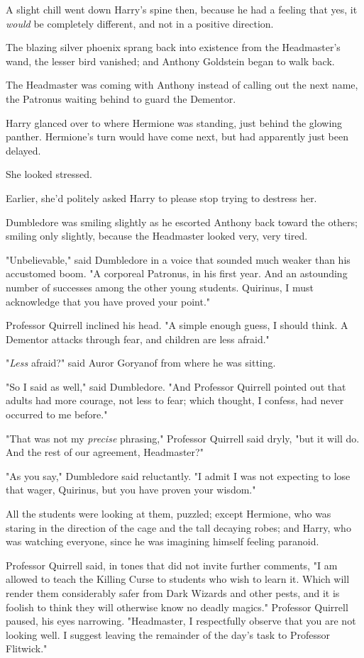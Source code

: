 A slight chill went down Harry's spine then, because he had a feeling that yes,
it \emph{would} be completely different, and not in a positive direction.

The blazing silver phoenix sprang back into existence from the Headmaster's
wand, the lesser bird vanished; and Anthony Goldstein began to walk back.

The Headmaster was coming with Anthony instead of calling out the next name,
the Patronus waiting behind to guard the Dementor.

Harry glanced over to where Hermione was standing, just behind the glowing
panther. Hermione's turn would have come next, but had apparently just been
delayed.

She looked stressed.

Earlier, she'd politely asked Harry to please stop trying to destress her.

Dumbledore was smiling slightly as he escorted Anthony back toward the others;
smiling only slightly, because the Headmaster looked very, very tired.

"Unbelievable," said Dumbledore in a voice that sounded much weaker than his
accustomed boom. "A corporeal Patronus, in his first year. And an astounding
number of successes among the other young students. Quirinus, I must
acknowledge that you have proved your point."

Professor Quirrell inclined his head. "A simple enough guess, I should think. A
Dementor attacks through fear, and children are less afraid."

"\emph{Less} afraid?" said Auror Goryanof from where he was sitting.

"So I said as well," said Dumbledore. "And Professor Quirrell pointed out that
adults had more courage, not less to fear; which thought, I confess, had never
occurred to me before."

"That was not my \emph{precise} phrasing," Professor Quirrell said dryly, "but
it will do. And the rest of our agreement, Headmaster?"

"As you say," Dumbledore said reluctantly. "I admit I was not expecting to lose
that wager, Quirinus, but you have proven your wisdom."

All the students were looking at them, puzzled; except Hermione, who was
staring in the direction of the cage and the tall decaying robes; and Harry,
who was watching everyone, since he was imagining himself feeling paranoid.

Professor Quirrell said, in tones that did not invite further comments, "I am
allowed to teach the Killing Curse to students who wish to learn it. Which will
render them considerably safer from Dark Wizards and other pests, and it is
foolish to think they will otherwise know no deadly magics." Professor Quirrell
paused, his eyes narrowing. "Headmaster, I respectfully observe that you are
not looking well. I suggest leaving the remainder of the day's task to
Professor Flitwick."

